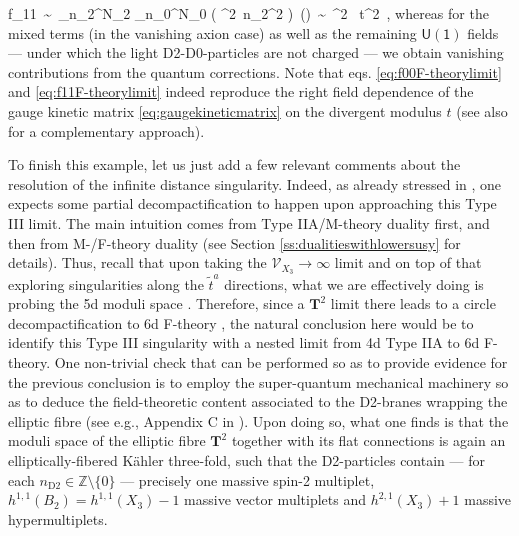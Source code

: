 %
\beq \label{eq:f11F-theorylimit}
		f_{11}\, \sim\, \sum_{n_{2}}^{N_{2}} \sum_{n_{0}}^{N_{0}}  \left(  \Mpf^2\,  n_{2}^2 \right)\, \log \left(\right)\, \sim \,  \Mpf^2 \, t^2\, ,
\eeq
%
whereas for the mixed terms (in the vanishing axion case) as well as the remaining $\mathsf{U(1)}$ fields --- under which the light D2-D0-particles are not charged --- we obtain vanishing contributions from the quantum corrections. Note that eqs. \eqref{eq:f00F-theorylimit} and \eqref{eq:f11F-theorylimit} indeed reproduce the right field dependence of the gauge kinetic matrix \eqref{eq:gaugekineticmatrix} on the divergent modulus $t$ \cite{Grimm:2018ohb} (see also \cite{Marchesano:2022axe} for a complementary approach).

		
To finish this example, let us just add a few relevant comments about the resolution of the infinite distance singularity. Indeed, as already stressed in \cite{Corvilain:2018lgw}, one expects some partial decompactification to happen upon approaching this Type III limit. The main intuition comes from Type IIA/M-theory duality first, and then from M-/F-theory duality (see Section \ref{ss:dualitieswithlowersusy} for details). Thus, recall that upon taking the $\mathcal{V}_{X_3}\to \infty$ limit and on top of that exploring singularities along the $\tilde{t}^a$ directions, what we are effectively doing is probing the 5d moduli space \cite{Witten:1996qb}. Therefore, since a $\mathbf{T}^2$ limit there leads to a circle decompactification to 6d F-theory \cite{Lee:2019wij}, the natural conclusion here would be to identify this Type III singularity with a nested limit from 4d Type IIA to 6d F-theory. One non-trivial check that can be performed so as to provide evidence for the previous conclusion is to employ the super-quantum mechanical machinery so as to deduce the field-theoretic content associated to the D2-branes wrapping the elliptic fibre (see e.g., Appendix C in \cite{Castellano:2022bvr}). Upon doing so, what one finds is that the moduli space of the elliptic fibre $\mathbf{T}^2$ together with its flat connections is again an elliptically-fibered K\"ahler three-fold, such that the D2-particles contain --- for each $n_{\text{D}2}\in  \mathbb{Z} \setminus \lbrace 0 \rbrace$ --- precisely one massive spin-2 multiplet, $h^{1,1} (B_2)=h^{1,1} (X_3)-1$ massive vector multiplets and $h^{2,1} (X_3)+1$ massive hypermultiplets.
		
